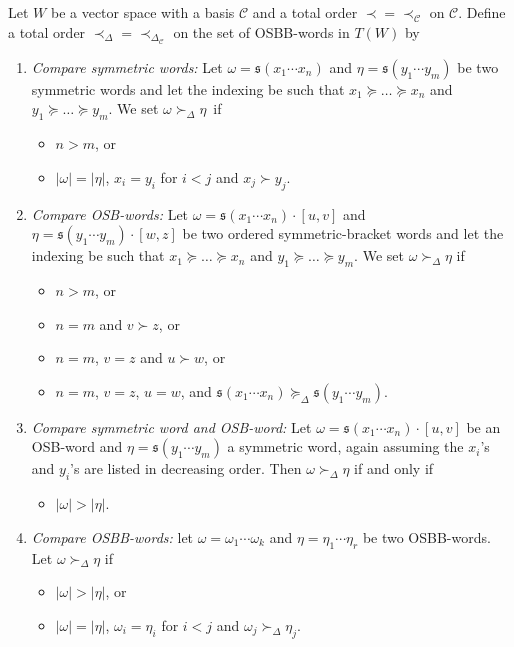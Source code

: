 \documentclass[10pt,a4paper]{amsart}
\newcommand{\A}{{\cal A}}
\numberwithin{equation}{section}
\begin{document}
\begin{Definition}%
 Let $W$ be a vector space with a basis $\mathcal{C}$ and a total order $\prec = \prec_{\mathcal{C}}$ on $\mathcal{C}$. Define a total order $\prec_{\Delta} = \prec_{\Delta_{\mathcal{C}}}$ on the set of OSBB-words in $T(W)$ by
 \begin{enumerate}\itemsep=0pt
 \item[(i)] \textit{Compare symmetric words:} Let $\omega = \mathfrak{s}(x_1 \cdots x_n)$ and $\eta = \mathfrak{s}(y_1 \cdots y_m)$ be two symmetric words and let the indexing be such that $x_1 \succeq \dots \succeq x_n$ and $y_1 \succeq \dots \succeq y_m$. We set $\omega \succ_{\Delta} \eta$~if
 \begin{itemize}\itemsep=0pt
 \item $n>m$, or
 \item $|\omega| = |\eta|$, $x_i = y_i$ for $i<j$ and $x_j \succ y_j$.
 \end{itemize}
 \item[(ii)] \textit{Compare OSB-words:} Let $\omega = \mathfrak{s}(x_1 \cdots x_n)\cdot[u,v]$ and $\eta = \mathfrak{s}(y_1 \cdots y_m)\cdot[w,z]$ be two ordered symmetric-bracket words and let the indexing be such that $x_1 \succeq \dots \succeq x_n$ and $y_1 \succeq \dots \succeq y_m$. We set $\omega \succ_{\Delta} \eta$ if
 \begin{itemize}\itemsep=0pt
 \item $n>m$, or
 \item $n=m$ and $v \succ z$, or
 \item $n=m$, $v=z$ and $u\succ w$, or
 \item $n=m$, $v=z$, $u=w$, and $\mathfrak{s}(x_1 \cdots x_n) \succeq_{\Delta} \mathfrak{s}(y_1 \cdots y_m)$.
 \end{itemize}
 \item[(iii)] \textit{Compare symmetric word and OSB-word:} Let $\omega = \mathfrak{s}(x_1 \cdots x_n)\cdot[u,v]$ be an OSB-word and $\eta = \mathfrak{s}(y_1 \cdots y_m)$ a symmetric word, again assuming the $x_i$'s and $y_i$'s are listed in decreasing order. Then $\omega \succ_{\Delta} \eta$ if and only if
 \begin{itemize}\itemsep=0pt
 \item $|\omega| > |\eta|$.
 \end{itemize}
 \item[(iv)] \textit{Compare OSBB-words:} let $\omega = \omega_1 \cdots \omega_k$ and $\eta = \eta_1 \cdots \eta_r$ be two OSBB-words. Let $\omega \succ_{\Delta} \eta$ if
 \begin{itemize}\itemsep=0pt
 \item $|\omega| > |\eta|$, or
 \item $|\omega|=|\eta|$, $\omega_i = \eta_i$ for $i<j$ and $\omega_j \succ_{\Delta} \eta_j$.
 \end{itemize}
 \end{enumerate}
\end{Definition}
\end{document}
